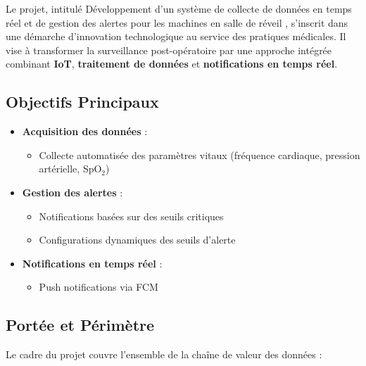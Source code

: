 Le projet, intitulé Développement d'un système de collecte de données en temps réel et de gestion des alertes pour les machines en salle de réveil , s'inscrit dans une démarche d'innovation technologique au service des pratiques médicales. Il vise à transformer la surveillance post-opératoire par une approche intégrée combinant \textbf{IoT}, \textbf{traitement de données} et \textbf{notifications en temps réel}.

\subsection{Objectifs Principaux}
\begin{itemize}
    \item \textbf{Acquisition des données} : 
    \begin{itemize}
        \item Collecte automatisée des paramètres vitaux (fréquence cardiaque, pression artérielle, SpO$_2$) 
    \end{itemize}
    
    \item \textbf{Gestion des alertes} :
    \begin{itemize}
        \item Notifications basées sur des seuils critiques
        \item Configurations dynamiques des seuils d'alerte
    \end{itemize}
    
    \item \textbf{Notifications en temps réel} :
    \begin{itemize}
        \item Push notifications via FCM
    \end{itemize}
    
\end{itemize}

\subsection{Portée et Périmètre}
Le cadre du projet couvre l'ensemble de la chaîne de valeur des données :

